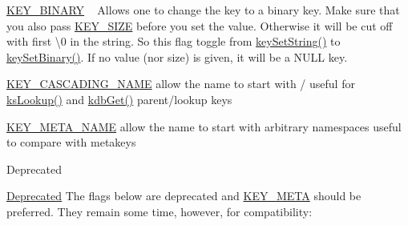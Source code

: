 \begin{DoxyItemize}
\item \mbox{\hyperlink{group__key_gga91fb3178848bd682000958089abbaf40a1ca18d4e094ae7487d35ecedda2235ff}{K\+E\+Y\+\_\+\+B\+I\+N\+A\+RY}} ~\newline
 Allows one to change the key to a binary key. Make sure that you also pass \mbox{\hyperlink{group__key_gga91fb3178848bd682000958089abbaf40a6d531b5c41445d19d0452eebdccbfa01}{K\+E\+Y\+\_\+\+S\+I\+ZE}} before you set the value. Otherwise it will be cut off with first \textbackslash{}0 in the string. So this flag toggle from \mbox{\hyperlink{group__keyvalue_ga622bde1eb0e0c4994728331326340ef2}{key\+Set\+String()}} to \mbox{\hyperlink{group__keyvalue_gaa50a5358fd328d373a45f395fa1b99e7}{key\+Set\+Binary()}}. If no value (nor size) is given, it will be a N\+U\+LL key. 
\begin{DoxyCodeInclude}{0}
\DoxyCodeLine{\textcolor{comment}{// Create and initialize a key with a name and nothing else}}
\end{DoxyCodeInclude}

\item \mbox{\hyperlink{group__key_gga91fb3178848bd682000958089abbaf40afc1567f74444ff9c219f7456b652b4ec}{K\+E\+Y\+\_\+\+C\+A\+S\+C\+A\+D\+I\+N\+G\+\_\+\+N\+A\+ME}} allow the name to start with / useful for \mbox{\hyperlink{group__keyset_gaa34fc43a081e6b01e4120daa6c112004}{ks\+Lookup()}} and \mbox{\hyperlink{group__kdb_ga28e385fd9cb7ccfe0b2f1ed2f62453a1}{kdb\+Get()}} parent/lookup keys
\item \mbox{\hyperlink{group__key_gga91fb3178848bd682000958089abbaf40a5205cbd2831bc881da3589a95c08e054}{K\+E\+Y\+\_\+\+M\+E\+T\+A\+\_\+\+N\+A\+ME}} allow the name to start with arbitrary namespaces useful to compare with metakeys

\begin{DoxyRefDesc}{Deprecated}
\item[\mbox{\hyperlink{deprecated__deprecated000010}{Deprecated}}]The flags below are deprecated and \mbox{\hyperlink{group__key_gga91fb3178848bd682000958089abbaf40a040582834bb2d90049947d7ef74e87e2}{K\+E\+Y\+\_\+\+M\+E\+TA}} should be preferred. They remain some time, however, for compatibility\+:\end{DoxyRefDesc}

\end{DoxyItemize}


